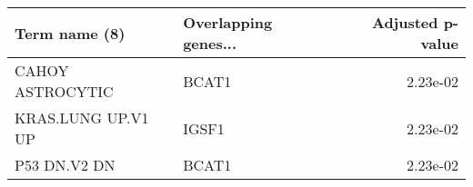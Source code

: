 \begin{tabular}{llr}
\toprule
     Term name (8) & Overlapping genes... &  Adjusted p-value \\
\midrule
  CAHOY ASTROCYTIC &                BCAT1 &          2.23e-02 \\
KRAS.LUNG UP.V1 UP &                IGSF1 &          2.23e-02 \\
      P53 DN.V2 DN &                BCAT1 &          2.23e-02 \\
\bottomrule
\end{tabular}
